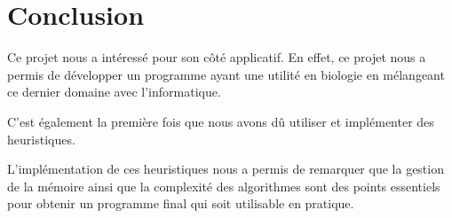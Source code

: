 
\section{Conclusion}

Ce projet nous a intéressé pour son côté applicatif. En effet, ce projet nous a
permis de développer un programme ayant une utilité en biologie en mélangeant
ce dernier domaine avec l'informatique.

C'est également la première fois que nous avons dû utiliser et implémenter des
heuristiques.

L'implémentation de ces heuristiques nous a permis de remarquer que la gestion
de la mémoire ainsi que la complexité des algorithmes sont des points essentiels
pour obtenir un programme final qui soit utilisable en pratique.

